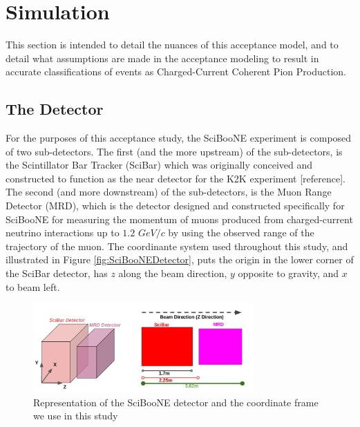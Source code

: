 \documentclass[11pt]{article}
\begin{document}
\section{Simulation}\label{sec:simulation}
This section is intended to detail the nuances of this acceptance model, and to detail what assumptions are made in the acceptance modeling to result in accurate classifications of events as Charged-Current Coherent Pion Production.

\subsection{The Detector}\label{subsec:detector}
For the purposes of this acceptance study, the SciBooNE experiment is composed of two sub-detectors. The first (and the more upstream) of the sub-detectors, is the Scintillator Bar Tracker (SciBar) which was originally conceived and constructed to function as the near detector for the K2K experiment [reference]. The second (and more downstream) of the sub-detectors, is the Muon Range Detector (MRD), which is the detector designed and constructed specifically for SciBooNE for measuring the momentum of muons produced from charged-current neutrino interactions up to $1.2$ $GeV/c$ by using the observed range of the trajectory of the muon. The coordinante system used throughout this study, and illustrated in  Figure \ref{fig:SciBooNEDetector}, puts the origin in the lower corner of the SciBar detector, has $z$ along the beam direction, $y$ opposite to gravity, and $x$ to beam left. 

\begin{figure}[H]
\centering
\includegraphics[width=0.75\textwidth]{EventClassifications/SciBooNEDetector.png}
\caption{Representation of the SciBooNE detector and the coordinate frame we use in this study}
\end{figure}\label{fig:SciBooNEDetector}
\end{document}

